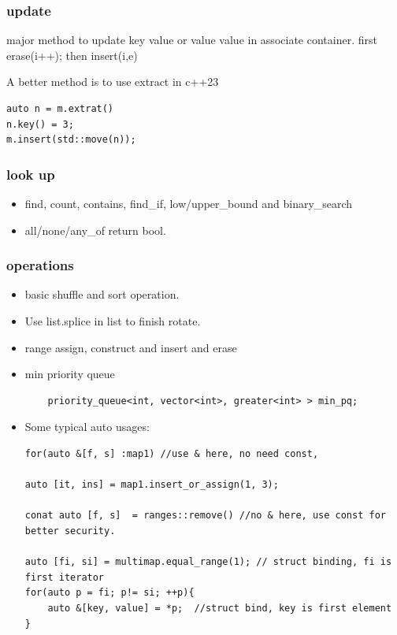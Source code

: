 \documentclass[a4paper,11pt,twoside]{book}
\begin{document}
\subsubsection{update}

major method to update key value or value value in associate container.  first erase(i++); then insert(i,e)

A better method is to use extract in c++23
\begin{lstlisting}
auto n = m.extrat()
n.key() = 3;
m.insert(std::move(n));	
\end{lstlisting}

\subsubsection{look up}
\begin{itemize}
\item find, count, contains, find\_if,  low/upper\_bound and binary\_search

\item all/none/any\_of return bool. 
\end{itemize}

\subsubsection{operations}

\begin{itemize}
	\item basic shuffle and sort operation. 

	\item Use list.splice in list to finish rotate. 

	\item range assign, construct and insert and erase

	\item min priority queue
\begin{lstlisting}
	priority_queue<int, vector<int>, greater<int> > min_pq;
\end{lstlisting}

	\item Some typical auto usages:
\begin{lstlisting}
for(auto &[f, s] :map1) //use & here, no need const, 

auto [it, ins] = map1.insert_or_assign(1, 3);

conat auto [f, s]  = ranges::remove() //no & here, use const for better security.

auto [fi, si] = multimap.equal_range(1); // struct binding, fi is first iterator
for(auto p = fi; p!= si; ++p){
	auto &[key, value] = *p;  //struct bind, key is first element
}	
\end{lstlisting}

\end{itemize}
\end{document}
